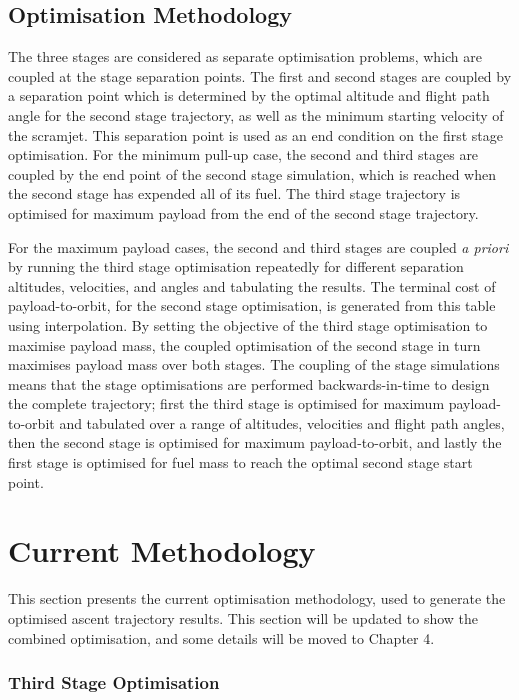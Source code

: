 \subsection{Optimisation Methodology}

The three stages are considered as separate optimisation problems, which are coupled at the stage separation points.
The first and second stages are coupled by a separation point which is determined by the optimal altitude and flight path angle for the second stage trajectory, as well as the minimum starting velocity of the scramjet. This separation point is used as an end condition on the first stage optimisation.
For the minimum pull-up case, the second and third stages are coupled by the end point of the second stage simulation, which is reached when the second stage has expended all of its fuel. The third stage trajectory is optimised for maximum payload from the end of the second stage trajectory.

For the maximum payload cases, the second and third stages are coupled \textit{a priori} by running the third stage optimisation repeatedly for different separation altitudes, velocities, and angles and tabulating the results. The terminal cost of payload-to-orbit, for the second stage optimisation, is generated from this table using interpolation. By setting the objective of the third stage optimisation to maximise payload mass, the coupled optimisation of the second stage in turn maximises payload mass over both stages. 
The coupling of the stage simulations means that the stage optimisations are performed backwards-in-time to design the complete trajectory; first the third stage is optimised for maximum payload-to-orbit and tabulated over a range of altitudes, velocities and flight path angles, then the second stage is optimised for maximum payload-to-orbit, and lastly the first stage is optimised for fuel mass to reach the optimal second stage start point. 

\section{Current Methodology}

This section presents the current optimisation methodology, used to generate the optimised ascent trajectory results. This section will be updated to show the combined optimisation, and some details will be moved to Chapter 4. 

\subsubsection{Third Stage Optimisation} \label{section:thirdstage}

